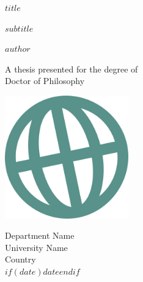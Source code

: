 %
%
%
% 

\thispagestyle{empty} %

\begin{center}
    \vspace*{1cm}
        
    \Huge
    \textbf{$title$}
        
    \vspace{0.5cm}
    \LARGE
    $subtitle$
        
    \vspace{1.5cm}
        
    \textbf{$author$}
        
    \vfill
        
    A thesis presented for the degree of\\
    Doctor of Philosophy
        
    \vspace{0.8cm}
        
    \includegraphics[width=0.4\textwidth]{logo.png}
        
    \Large
    Department Name\\
    University Name\\
    Country\\
    $if(date)$$date$$endif$\\
        
\end{center}
